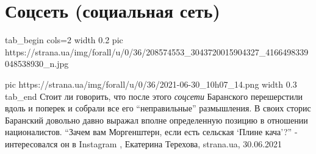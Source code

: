  
 
 
 
 
\chapter{Соцсеть (социальная сеть)}
\label{sec:slova.socset}

\ifcmt
tab_begin cols=2
  width 0.2
  pic https://strana.ua/img/forall/u/0/36/208574553_3043720015904327_4166498339048538930_n.jpg

  pic https://strana.ua/img/forall/u/0/36/2021-06-30_10h07_14.png
  width 0.3
tab_end
\fi
Стоит ли говорить, что после этого \emph{соцсети} Баранского перешерстили вдоль и
поперек и собрали все его \enquote{неправильные} размышления.  В своих сторис
Баранский довольно давно выражал вполне определенную позицию в отношении
националистов.  \enquote{Зачем вам Моргенштерн, если есть сельская
\enquote{Плине кача}?} - интересовался он в Instagram
, 
Екатерина Терехова, strana.ua, 30.06.2021
